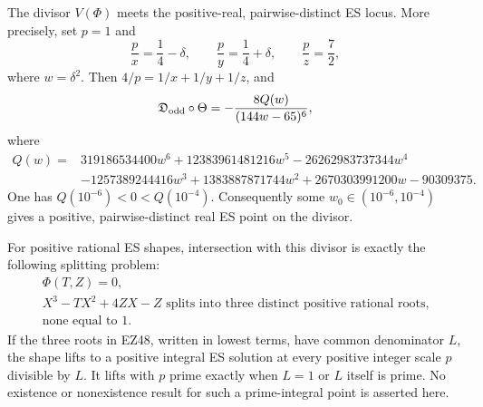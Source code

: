 \begin{theorem}
\label{thm:odd-positive-real}
The divisor \(V(\Phi)\) meets the positive-real, pairwise-distinct ES locus.
More precisely, set \(p=1\) and
\begin{equation}
 \frac px=\frac14-\delta,\qquad
 \frac py=\frac14+\delta,\qquad
 \frac pz=\frac72,                                                \tag{EZ47}
\end{equation}
where \(w=\delta^2\).  Then \(4/p=1/x+1/y+1/z\), and
\[
 \mathfrak D_{\rm odd}\circ\Theta
 =-\frac{8Q(w)}{(144w-65)^6},
\]
where
\begin{align*}
Q(w)={}&319186534400w^6+12383961481216w^5-26262983737344w^4\\
&-1257389244416w^3+1383887871744w^2
+2670303991200w-90309375.
\end{align*}
One has \(Q(10^{-6})<0<Q(10^{-4})\).  Consequently some
\(w_0\in(10^{-6},10^{-4})\) gives a positive, pairwise-distinct real ES point
on the divisor.

For positive rational ES shapes, intersection with this divisor is exactly the
following splitting problem:
\begin{equation}
\begin{gathered}
 \Phi(T,Z)=0,\\
 X^3-TX^2+4ZX-Z
 \text{ splits into three distinct positive rational roots,}\\
 \text{none equal to }1.
\end{gathered}                                                       \tag{EZ48}
\end{equation}
If the three roots in EZ48, written in lowest terms, have common denominator
\(L\), the shape lifts to a positive integral ES solution at every positive
integer scale \(p\) divisible by \(L\).  It lifts with \(p\) prime exactly when
\(L=1\) or \(L\) itself is prime.  No existence or nonexistence result for
such a prime-integral point is asserted here.
\end{theorem}


